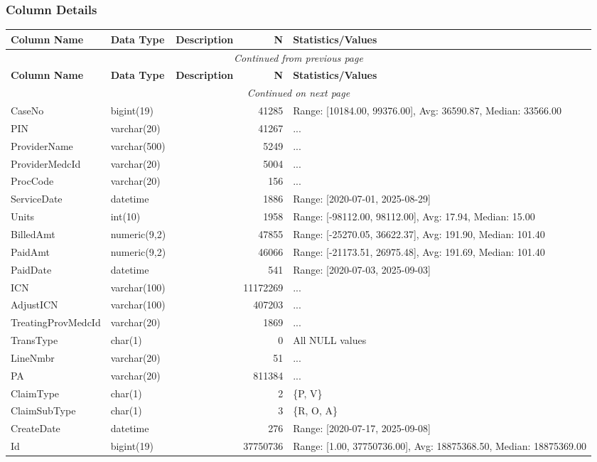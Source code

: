\begin{landscape}
\subsubsection{Column Details}
\begin{longtable}{|l|l|l|r|p{6cm}|}
\hline
\textbf{Column Name} & \textbf{Data Type} & \textbf{Description} & \textbf{N} & \textbf{Statistics/Values} \\
\hline
\endfirsthead
\multicolumn{5}{c}{\textit{Continued from previous page}} \\
\hline
\textbf{Column Name} & \textbf{Data Type} & \textbf{Description} & \textbf{N} & \textbf{Statistics/Values} \\
\hline
\endhead
\hline
\multicolumn{5}{c}{\textit{Continued on next page}} \\
\endfoot
\hline
\endlastfoot
CaseNo & bigint(19) &  & 41285 & Range: [10184.00, 99376.00], Avg: 36590.87, Median: 33566.00 \\
\hline
PIN & varchar(20) &  & 41267 & ... \\
\hline
ProviderName & varchar(500) &  & 5249 & ... \\
\hline
ProviderMedcId & varchar(20) &  & 5004 & ... \\
\hline
ProcCode & varchar(20) &  & 156 & ... \\
\hline
ServiceDate & datetime &  & 1886 & Range: [2020-07-01, 2025-08-29] \\
\hline
Units & int(10) &  & 1958 & Range: [-98112.00, 98112.00], Avg: 17.94, Median: 15.00 \\
\hline
BilledAmt & numeric(9,2) &  & 47855 & Range: [-25270.05, 36622.37], Avg: 191.90, Median: 101.40 \\
\hline
PaidAmt & numeric(9,2) &  & 46066 & Range: [-21173.51, 26975.48], Avg: 191.69, Median: 101.40 \\
\hline
PaidDate & datetime &  & 541 & Range: [2020-07-03, 2025-09-03] \\
\hline
ICN & varchar(100) &  & 11172269 & ... \\
\hline
AdjustICN & varchar(100) &  & 407203 & ... \\
\hline
TreatingProvMedcId & varchar(20) &  & 1869 & ... \\
\hline
TransType & char(1) &  & 0 & All NULL values \\
\hline
LineNmbr & varchar(20) &  & 51 & ... \\
\hline
PA & varchar(20) &  & 811384 & ... \\
\hline
ClaimType & char(1) &  & 2 & \{P, V\} \\
\hline
ClaimSubType & char(1) &  & 3 & \{R, O, A\} \\
\hline
CreateDate & datetime &  & 276 & Range: [2020-07-17, 2025-09-08] \\
\hline
Id & bigint(19) &  & 37750736 & Range: [1.00, 37750736.00], Avg: 18875368.50, Median: 18875369.00 \\
\hline
\end{longtable}


\end{landscape}
